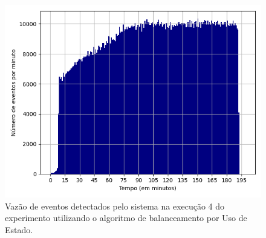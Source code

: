






\begin{figure}[h]
\centering
\includegraphics[width=\textwidth]{figuras/graphics/histogram_vazao_9-dez-su.png}
\caption{Vazão de eventos detectados pelo sistema na execução 4 do experimento utilizando o algoritmo de balanceamento por Uso de Estado.}
\label{fig:vazao_9-dez-su}
\end{figure}



